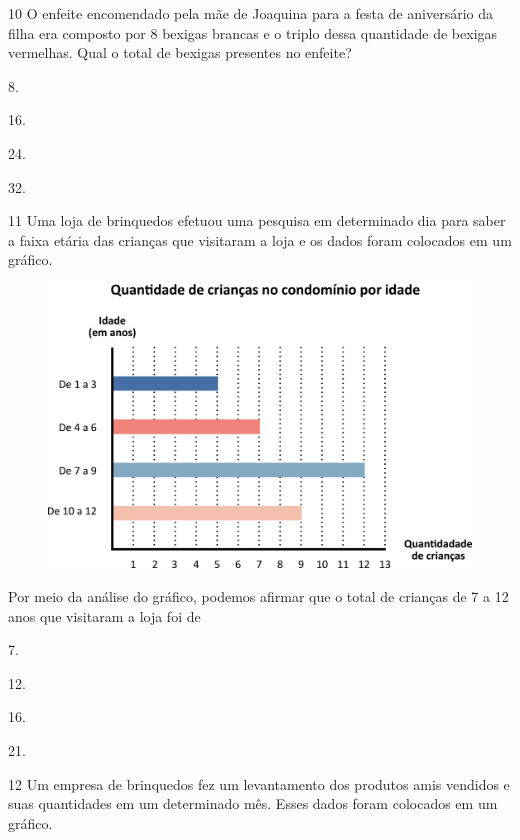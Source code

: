 \num{10} O enfeite encomendado pela mãe de Joaquina para a festa de aniversário da filha era composto por 8 bexigas brancas e o triplo dessa quantidade de bexigas vermelhas. Qual o total de bexigas presentes no enfeite?

\begin{escolha}
\item
  8.
\item
  16.
\item
  24.
\item
  32.
\end{escolha}

\num{11} Uma loja de brinquedos efetuou uma pesquisa em determinado dia para saber a faixa etária das crianças que visitaram a loja e os dados foram
colocados em um gráfico.

\begin{figure}[htpb!]
\centering
\includegraphics[width=\textwidth]{./media/image118.png}
\end{figure}

Por meio da análise do gráfico, podemos afirmar que o total de crianças de 7 a 12 anos que visitaram a loja foi de

\begin{escolha}
\item
  7.
\item
  12.
\item
  16.
\item
  21.
\end{escolha}


\pagebreak
\num{12} Um empresa de brinquedos fez um levantamento dos produtos amis vendidos e suas quantidades em um determinado mês. Esses dados foram colocados em um gráfico.


